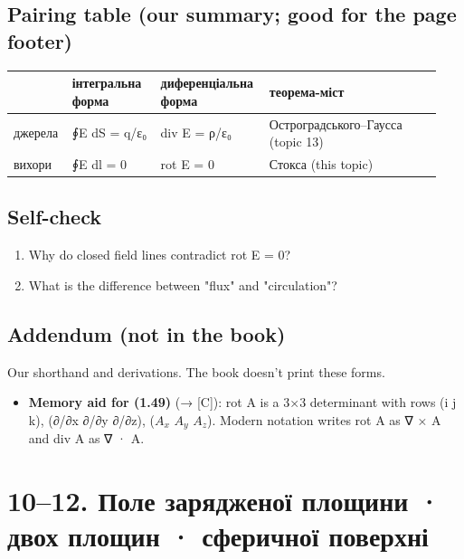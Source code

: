 \documentclass[11pt,a4paper,oneside]{book}
\begin{document}
\section*{Pairing table (our summary; good for the page footer)}
{\small
\begin{longtable}{>{\raggedright\arraybackslash}p{0.091\linewidth}>{\raggedright\arraybackslash}p{0.205\linewidth}>{\raggedright\arraybackslash}p{0.242\linewidth}>{\raggedright\arraybackslash}p{0.398\linewidth}}
\toprule
\textbf{} & \textbf{інтегральна форма} & \textbf{диференціальна форма} & \textbf{теорема-міст} \\
\midrule
\endhead
джерела & ∮E dS = q/ε₀ & div E = ρ/ε₀ & Остроградського–Гаусса (topic 13) \\
вихори & ∮E dl = 0 & rot E = 0 & Стокса (this topic) \\
\bottomrule
\end{longtable}
}

\section*{Self-check}
\begin{enumerate}
\item Why do closed field lines contradict rot E = 0?
\item What is the difference between "flux" and "circulation"?
\end{enumerate}

\section*{Addendum (not in the book)}
Our shorthand and derivations. The book doesn't print these forms.
\begin{itemize}
\item \textbf{Memory aid for (1.49)} (→ [C]): rot A is a 3×3 determinant with rows (i j k), (∂/∂x ∂/∂y ∂/∂z), ($A_{x}$ $A_{y}$ $A_{z}$). Modern notation writes rot A as ∇ × A and div A as ∇ · A.
\end{itemize}

\chapter*{10–12. Поле зарядженої площини · двох площин · сферичної поверхні}
\end{document}

